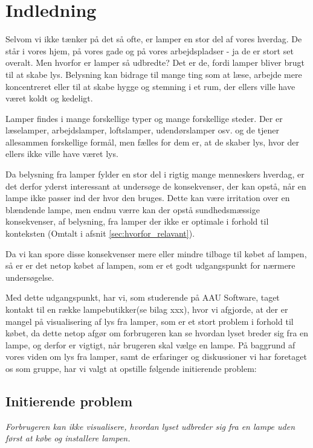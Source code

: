 \section{Indledning}
Selvom vi ikke tænker på det så ofte, er lamper en stor del af vores hverdag. De står i vores hjem, på vores gade og på vores arbejdspladser - ja de er stort set overalt. Men hvorfor er lamper så udbredte? Det er de, fordi lamper bliver brugt til at skabe lys. Belysning kan bidrage til mange ting som at læse, arbejde mere koncentreret eller til at skabe hygge og stemning i et rum, der ellers ville have været koldt og kedeligt. 

Lamper findes i mange forskellige typer og mange forskellige steder. Der er læselamper, arbejdslamper, loftslamper, udendørslamper osv. og de tjener allesammen forskellige formål, men fælles for dem er, at de skaber lys, hvor der ellers ikke ville have været lys. 

Da belysning fra lamper fylder en stor del i rigtig mange menneskers hverdag, er det derfor yderst interessant at undersøge de konsekvenser, der kan opstå, når en lampe ikke passer ind der hvor den bruges. Dette kan være irritation over en blændende lampe, men endnu værre kan der opstå sundhedsmæssige konsekvenser, af belysning, fra lamper der ikke er optimale i forhold til konteksten (Omtalt i afsnit \ref{sec:hvorfor_relavant}).

Da vi kan spore disse konsekvenser mere eller mindre tilbage til købet af lampen, så er er det netop købet af lampen, som er et godt udgangspunkt for nærmere undersøgelse.

Med dette udgangspunkt, har vi, som studerende på AAU Software, taget kontakt til en række lampebutikker(se bilag xxx), hvor vi afgjorde, at der er mangel på visualisering af lys fra lamper, som er et stort problem i forhold til købet, da dette netop afgør om forbrugeren kan se hvordan lyset breder sig fra en lampe, og derfor er vigtigt, når brugeren skal vælge en lampe. På baggrund af vores viden om lys fra lamper, samt de erfaringer og diskussioner vi har foretaget os som gruppe, har vi valgt at opstille følgende initierende problem:

\subsection{Initierende problem}
\textit{Forbrugeren kan ikke visualisere, hvordan lyset udbreder sig fra en lampe uden først at købe og installere lampen.}

\clearpage